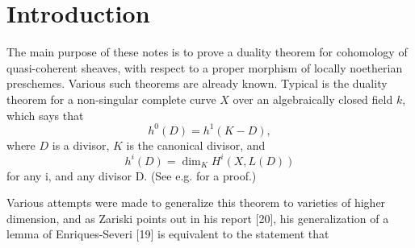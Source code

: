 \chapter{Introduction}

The main purpose of these notes is to prove a
duality theorem for cohomology of quasi-coherent sheaves, 
with respect to a proper morphism of locally noetherian 
preschemes. 
Various such theorems are already known. 
Typical is the duality theorem for a non-singular complete 
curve $X$ over an algebraically closed field $k$, 
which says that
\begin{equation*}
    h^0(D)=h^1(K-D),
\end{equation*}
where $D$ is a divisor, $K$ is the canonical divisor, and
\begin{equation*}
    h^i(D)=\dim_K H^i(X,L(D))
\end{equation*}
for any i, and any divisor D. 
(See e.g. \cite[Ch.~II]{SerreGr} for a proof.)

Various attempts were made to generalize this theorem 
to varieties of higher dimension, 
and as Zariski points out in his report [20], 
his generalization of a lemma of 
Enriques-Severi [19] is equivalent to the statement that






